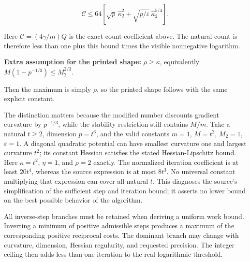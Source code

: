 \documentclass[11pt,a4paper]{article}
\begin{document}
\[\mathcal C\le64\left[\sqrt p\,\widehat\kappa_2^2+
\sqrt{p/\varepsilon}\,\widehat\kappa_2^{5/4}\right],\]


Here \(\mathcal C=(4\gamma/m)Q\) is the exact count coefficient
above. The natural count is therefore less than one plus this bound times
the visible nonnegative logarithm.




\textbf{Extra assumption for the printed shape:} \(\rho\ge\kappa\), equivalently \(M(1-p^{-1/3})\le M_2^{2/3}\).




Then the maximum is simply \(\rho\), so the printed shape follows with the same explicit constant.




The distinction matters because the modified number discounts gradient
curvature by \(p^{-1/3}\), while the stability restriction still
contains \(M/m\). Take a natural \(t\ge2\), dimension \(p=t^6\),
and the valid constants \(m=1\), \(M=t^2\), \(M_2=1\),
\(\varepsilon=1\). A diagonal quadratic potential can have smallest
curvature one and largest curvature \(t^2\); its constant Hessian satisfies
the stated Hessian-Lipschitz bound. Here \(\kappa=t^2\),
\(\eta=1\), and \(\rho=2\) exactly. The normalized iteration
coefficient is at least \(20t^4\), whereas the source expression is at most
\(8t^3\). No universal constant multiplying that expression can cover all
natural \(t\). This diagnoses the source's simplification of the sufficient step and iteration bound;
it asserts no lower bound on the best possible behavior of the algorithm.



All inverse-step branches must be retained when deriving a uniform work bound. Inverting a minimum of positive admissible steps produces a maximum of the corresponding positive reciprocal costs. The dominant branch may change with curvature, dimension, Hessian regularity, and requested precision. The integer ceiling then adds less than one iteration to the real logarithmic threshold.
\end{document}
